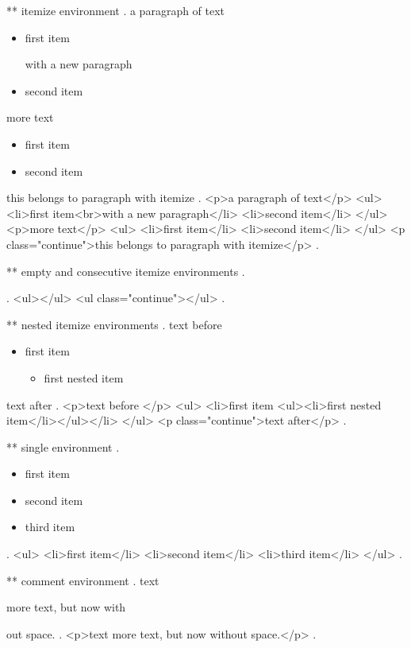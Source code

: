 ** itemize environment
.
a paragraph of text

\begin{itemize}
    \item first item

        with a new paragraph
    \item second item
\end{itemize}

more text

\begin{itemize}
    \item first item
    \item second item
\end{itemize}
this belongs to paragraph with itemize
.
<p>a paragraph of text</p>
<ul>
<li>ﬁrst item<br>with a new paragraph</li>
<li>second item</li>
</ul>
<p>more text</p>
<ul>
<li>ﬁrst item</li>
<li>second item</li>
</ul>
<p class="continue">this belongs to paragraph with itemize</p>
.


** empty and consecutive itemize environments
.
\begin{itemize}
\end{itemize}
\begin{itemize}
\end{itemize}
.
<ul></ul>
<ul class="continue"></ul>
.


** nested itemize environments
.
text before
\begin{itemize}
    \item first item
        \begin{itemize}
            \item first nested item
        \end{itemize}
\end{itemize}
text after
.
<p>text before </p>
<ul>
<li>ﬁrst item <ul><li>ﬁrst nested item</li></ul></li>
</ul>
<p class="continue">text after</p>
.


** single environment
.
\begin{itemize}
    \item first item
    \item second item
    \item third item
\end{itemize}
.
<ul>
<li>ﬁrst item</li>
<li>second item</li>
<li>third item</li>
</ul>
.


** comment environment
.
text
\begin{comment}
    This is a comment.
    \end{comment
    still more comment.
\end{comment}
more text, but now with%
\begin{comment}
    This is a comment.
\end{comment}
out space.
.
<p>text more text, but now without space.</p>
.